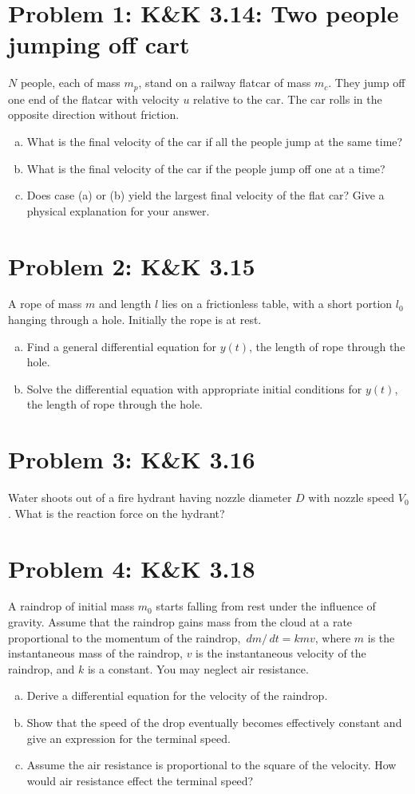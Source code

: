 \documentclass[problems]{esg8012pset}
\date{October 1}
\renewcommand{\d}{\,d}
\begin{document}
\section*{Problem 1: K\&K 3.14: Two people jumping off cart}
  $N$ people, each of mass $m_p$, stand on a railway flatcar of mass $m_c$. They jump off one end of the flatcar with velocity $u$ relative to the car. The car rolls in the opposite direction without friction.
  \begin{enumerate}[(a)]
    \item What is the final velocity of the car if all the people jump at the same time?
    \item What is the final velocity of the car if the people jump off one at a time?
    \item Does case (a) or (b) yield the largest final velocity of the flat car?  Give a physical explanation for your answer.
  \end{enumerate}
\section*{Problem 2: K\&K 3.15}
  A rope of mass $m$ and length $l$ lies on a frictionless table, with a short portion $l_0$ hanging through a hole. Initially the rope is at rest.
  \begin{enumerate}[(a)]
    \item Find a general differential equation for $y(t)$, the length of rope through the hole.
    \item Solve the differential equation with appropriate initial conditions for $y(t)$, the length of rope through the hole.
  \end{enumerate}
\section*{Problem 3: K\&K 3.16}
  Water shoots out of a fire hydrant having nozzle diameter $D$ with nozzle speed $V_0$. What is the reaction force on the hydrant?
\section*{Problem 4: K\&K 3.18}
  A raindrop of initial mass $m_0$ starts falling from rest under the influence of gravity. Assume that the raindrop gains mass from the cloud at a rate proportional to the momentum of the raindrop, $\d m / \d t = k m v$, where $m$ is the instantaneous mass of the raindrop, $v$ is the instantaneous velocity of the raindrop, and $k$ is a constant. You may neglect air resistance.
  \begin{enumerate}[(a)]
    \item Derive a differential equation for the velocity of the raindrop.
    \item Show that the speed of the drop eventually becomes effectively constant and give an expression for the terminal speed.
    \item Assume the air resistance is proportional to the square of the velocity. How would air resistance effect the terminal speed?
  \end{enumerate}
\end{document}
